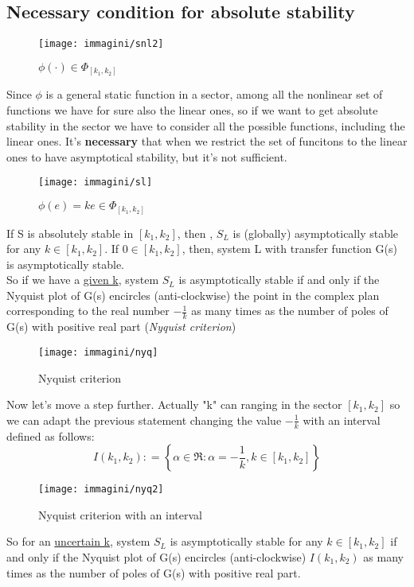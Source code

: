 \subsection{Necessary condition for absolute stability} \label{S_L}
\begin{figure}[H]
	\centering
	\texttt{[image: immagini/snl2]}
	\caption{$\phi(\cdot) \in \Phi_{[k_1,k_2]}$}
	\label{fig:snl2}
\end{figure}
Since $\phi$ is a general static function in a sector, among all the nonlinear set of functions we have for sure also the linear ones, so if we want to get absolute stability in the sector we have to consider all the possible functions, including the linear ones. It's \textbf{necessary} that when we restrict the set of funcitons to the linear ones to have asymptotical stability, but it's not sufficient.
\begin{figure}[H]
	\centering
	\texttt{[image: immagini/sl]}
	\caption{$\phi(e)= ke  \in \Phi_{[k_1,k_2]}$}
	\label{fig:sl}
\end{figure}
If S is absolutely stable in $[k_1,k_2]$, then , $S_L$ is (globally) asymptotically stable for any $k \in [k_1,k_2]$. If $0 \in [k_1,k_2]$, then, system L with transfer function G(s) is asymptotically stable.\\
So if we have a \underline{given k}, system $S_L$ is asymptotically stable if and only if the Nyquist plot of G(s) encircles (anti-clockwise) the point in the complex plan corresponding to the real number $-\frac{1}{k}$ as many times as the number of poles of G(s) with positive real part (\emph{Nyquist criterion})
\begin{figure}[H]
	\centering
	\texttt{[image: immagini/nyq]}
	\caption{Nyquist criterion}
	\label{fig:nyq}
\end{figure}
Now let's move a step further. Actually "k" can ranging in the sector $[k_1,k_2]$ so we can adapt the previous statement changing the value $-\frac{1}{k}$ with an interval defined as follows: \[I(k_1,k_2)\colon= \left\{\alpha \in \Re\colon \alpha =-\frac{1}{k}, k \in [k_1,k_2]\right\}\]
\begin{figure}[H]
	\centering
	\texttt{[image: immagini/nyq2]}
	\caption{Nyquist criterion with an interval}
	\label{fig:nyq2}
\end{figure}
So for an \underline{uncertain k}, system $S_L$ is asymptotically stable for any $k\in[k_1, k_2]$ if and only if the Nyquist plot of G(s) encircles (anti-clockwise) $I(k_1,k_2)$ as many times as the number of poles of G(s) with positive real part.
